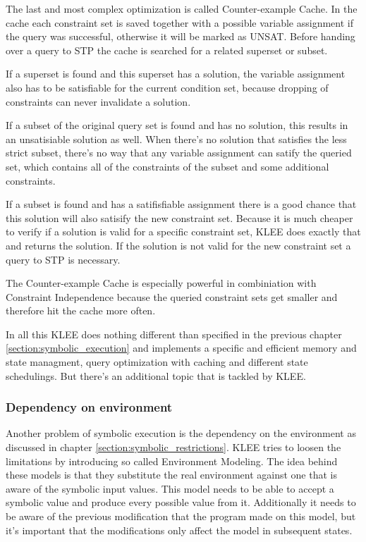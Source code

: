 The last and most complex optimization is called Counter-example Cache. In the cache each constraint set is saved together with a possible variable assignment if the query was successful, otherwise it will be marked as UNSAT. Before handing over a query to STP the cache is searched for a related superset or subset.

If a superset is found and this superset has a solution, the variable assignment also has to be satisfiable for the current condition set, because dropping of constraints can never invalidate a solution.

If a subset of the original query set is found and has no solution, this results in an unsatisiable solution as well. When there's no solution that satisfies the less strict subset, there's no way that any variable assignment can satify the queried set, which contains all of the constraints of the subset and some additional constraints.

If a subset is found and has a satifisfiable assignment there is a good chance that this solution will also satisify the new constraint set. Because it is much cheaper to verify if a solution is valid for a specific constraint set, KLEE does exactly that and returns the solution. If the solution is not valid for the new constraint set a query to STP is necessary.

The Counter-example Cache is especially powerful in combiniation with Constraint Independence because the queried constraint sets get smaller and therefore hit the cache more often.

In all this KLEE does nothing different than specified in the previous chapter \ref{section:symbolic_execution} and implements a specific and efficient memory and state managment, query optimization with caching and different state schedulings. But there's an additional topic that is tackled by KLEE.
\subsubsection{Dependency on environment}
Another problem of symbolic execution is the dependency on the environment as discussed in chapter \ref{section:symbolic_restrictions}. KLEE tries to loosen the limitations by introducing so called Environment Modeling. The idea behind these models is that they substitute the real environment against one that is aware of the symbolic input values. 
This model needs to be able to accept a symbolic value and produce every possible value from it. Additionally it needs to be aware of the previous modification that the program made on this model, but it's important that the modifications only affect the model in subsequent states. 


